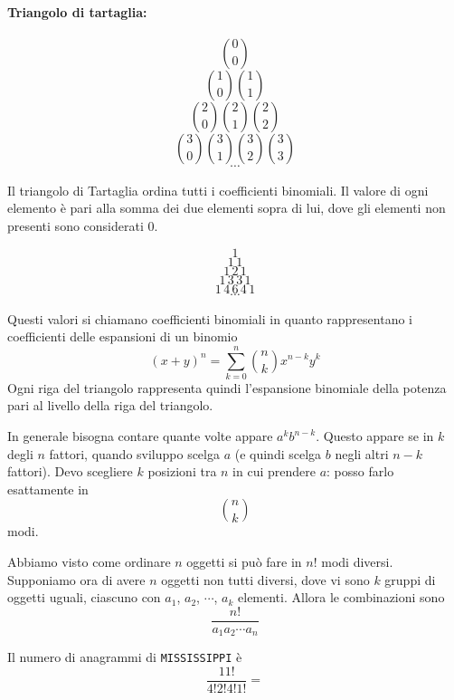 \documentclass[a4paper]{article}
\begin{document}
\pagebreak

\paragraph{Triangolo di tartaglia:}

\[ \binom{0}{0} \]
\[ \binom{1}{0} \binom{1}{1} \]
\[ \binom{2}{0} \binom{2}{1} \binom{2}{2} \]
\[ \binom{3}{0} \binom{3}{1} \binom{3}{2} \binom{3}{3} \]
\[ \cdots \]

Il triangolo di Tartaglia ordina tutti i coefficienti binomiali.
Il valore di ogni elemento è pari alla somma dei due elementi sopra di lui, dove gli elementi non presenti
sono considerati \(0\).

\[ 1 \]
\[ 1\,1 \]
\[ 1\,2\,1 \]
\[ 1\,3\,3\,1 \]
\[ 1\,4\,6\,4\,1 \]
\[ \cdots \]

Questi valori si chiamano coefficienti binomiali in quanto rappresentano i coefficienti delle espansioni di un binomio
\[
    {(x+y)}^n = \sum_{k=0}^n \binom{n}{k} x^{n-k}y^k
\]
Ogni riga del triangolo rappresenta quindi l'espansione binomiale della potenza pari al livello
della riga del triangolo.

In generale bisogna contare quante volte appare \(a^kb^{n-k}\).
Questo appare se in \(k\) degli \(n\) fattori, quando
sviluppo scelga \(a\) (e quindi scelga \(b\) negli altri \(n-k\) fattori).
Devo scegliere \(k\) posizioni tra \(n\) in cui prendere \(a\): posso farlo esattamente in
\[ \binom{n}{k} \]
modi.

Abbiamo visto come ordinare \(n\) oggetti si può fare
in \(n!\) modi diversi. Supponiamo ora di avere \(n\) oggetti non tutti diversi,
dove vi sono \(k\) gruppi di oggetti uguali, ciascuno con \(a_1\), \(a_2\), \(\cdots\), \(a_k\)
elementi. Allora le combinazioni sono
\[
    \frac{n!}{a_1a_2\cdots a_n}
\]

Il numero di anagrammi di \texttt{MISSISSIPPI} è
\[
    \frac{11!}{4!2!4!1!} = 
\]
\end{document}
